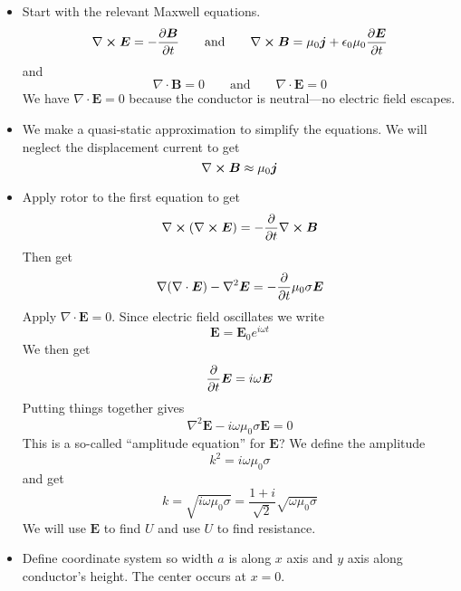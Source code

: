 \documentclass[11pt, a4paper]{article}
\newcommand{\eqtext}[1]{\qquad \text{#1} \qquad}
\renewcommand{\vec}[1]{\bm{#1}} %
\newcommand{\E}{\vec{E}}  %
\newcommand{\B}{\vec{B}}  %
\newcommand{\ee}{\epsilon_{0}}  %
\newcommand{\mm}{\mu_{0}}  %
\newcommand{\m}{\vec{m}}  %
\renewcommand{\div}{\nabla \cdot}
\renewcommand{\curl}{\nabla \cross}
\renewcommand{\grad}{\nabla}
\renewcommand{\laplacian}{\nabla^{2}}
\begin{document}
\begin{itemize}
	\item Start with the relevant Maxwell equations. 
	\begin{equation*}
		\curl \E = - \pdv{\B}{t} \eqtext{and} \curl \B = \mm \vec{j} + \ee\mm \pdv{\E}{t}
	\end{equation*}
	and
	\begin{equation*}
		\div \B = 0 \eqtext{and} \div \E = 0
	\end{equation*}
	We have $ \div \E = 0 $ because the conductor is neutral---no electric field escapes.
	
	\item We make a quasi-static approximation to simplify the equations. We will neglect the displacement current to get
	\begin{equation*}
		 \curl \B \approx \mm \vec{j}
	\end{equation*}
	
	\item Apply rotor to the first equation to get 
	\begin{equation*}
		\curl (\curl \E) = - \pdv{t} \curl \B
	\end{equation*}
	Then get
	\begin{equation*}
		\grad (\div \E) - \laplacian \E = - \pdv{t} \mm \sigma \E
	\end{equation*}
	Apply $ \div \E = 0 $. Since electric field oscillates we write
	\begin{equation*}
		\E = \E_{0} e^{i\omega t}
	\end{equation*}
	We then get
	\begin{equation*}
		\pdv{t}\E = i \omega \E
	\end{equation*}
	Putting things together gives
	\begin{equation*}
		\laplacian \E - i \omega \mm \sigma \E = 0
	\end{equation*}
	This is a so-called ``amplitude equation'' for $ \E $? We define the amplitude
	\begin{equation*}
		k^{2} = i \omega \mm \sigma
	\end{equation*}
	and get
	\begin{equation*}
		k = \sqrt{i \omega \mm \sigma} = \frac{1 + i}{\sqrt{2}}\sqrt{\omega \mm \sigma}
	\end{equation*}
	We will use $ \E $ to find $ U $ and use $ U $ to find resistance.
	
	\item Define coordinate system so width $ a $ is along $ x $ axis and $ y $ axis along conductor's height. The center occurs at $ x = 0 $. 
	

\end{itemize}
\end{document}
